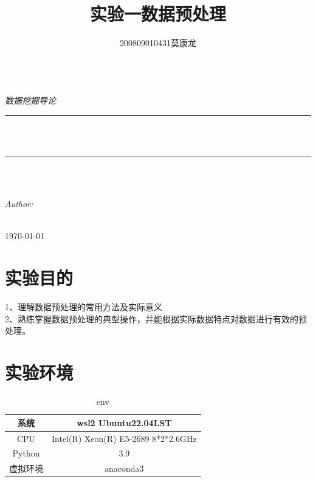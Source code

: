 \documentclass{article}
\title{实验一数据预处理}
\author{200809010431莫康龙}
\begin{document}
\begin{titlepage}
	\newcommand{\HRule}{\rule{\linewidth}{0.5mm}}
	\center 
	\quad\\[3.5cm]
	\textsl{\Large 数据挖掘导论 }\\[0.5cm] 
	\makeatletter
	\HRule \\[0.4cm]
	{ \huge \bfseries \@title}\\[0.4cm] 
	\HRule \\[1.5cm]
    \quad\\[1.5cm]
	\begin{minipage}{0.4\textwidth}
		\begin{flushleft} \large
			\emph{Author:}\\
			\@author 
		\end{flushleft}
	\end{minipage}
	~
	\makeatother
    \quad\\[2.5cm]
	{\large \today}\\[2cm] 
	\vfill 
\end{titlepage}

\section{实验目的}
1、理解数据预处理的常用方法及实际意义\\
2、熟练掌握数据预处理的典型操作，并能根据实际数据特点对数据进行有效的预处理。\\
\section{实验环境}
\begin{center}
    \begin{table}[htbp]
        \centering
        \caption{env}
        \begin{tabular}{c|c}\toprule
            系统 & wsl2 Ubuntu22.04LST\\\hline
            CPU & Intel(R) Xeon(R) E5-2689 8*2*2.6GHz\\\hline
            Python & 3.9\\\hline
            虚拟环境 & anaconda3\\
        \bottomrule\end{tabular}
    \end{table}
\end{center}
\end{document}
